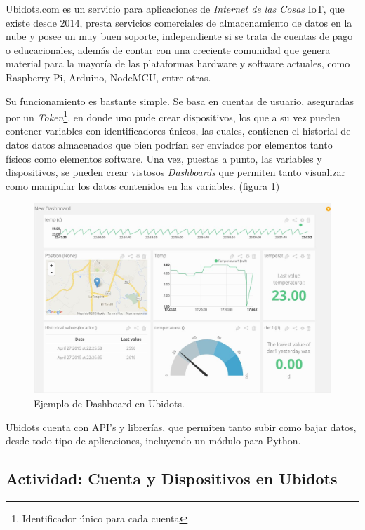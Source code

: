 \documentclass[letterpaper, 10pt]{report}
\begin{document}
Ubidots.com es un servicio para aplicaciones de \emph{Internet de las Cosas} IoT, que existe desde 2014, presta servicios comerciales de almacenamiento de datos en la nube y posee un muy buen soporte, independiente si se trata de cuentas de pago o educacionales, además de contar con una creciente comunidad que genera material para la mayoría de las plataformas hardware y software actuales, como Raspberry Pi, Arduino, NodeMCU, entre otras.

Su funcionamiento es bastante simple. Se basa en cuentas de usuario, aseguradas por un \emph{Token}\footnote{Identificador único para cada cuenta}, en donde uno pude crear dispositivos, los que a su vez pueden contener variables con identificadores únicos, las cuales, contienen el historial de datos datos almacenados que bien podrían ser enviados por elementos tanto físicos como elementos software. Una vez, puestas a punto, las variables y dispositivos, se pueden crear vistosos \emph{Dashboards} que permiten tanto visualizar como manipular los datos contenidos en las variables. (figura \ref{dashboard})

\begin{figure}[h!]
	\centering
	\includegraphics[scale=0.2]{dashboard.jpg}
	\caption{Ejemplo de Dashboard en Ubidots. \label{dashboard}}
\end{figure}

Ubidots cuenta con API's y librerías, que permiten tanto subir como bajar datos, desde todo tipo de aplicaciones, incluyendo un módulo para Python.

\subsection{Actividad: Cuenta y Dispositivos en Ubidots}
\end{document}
